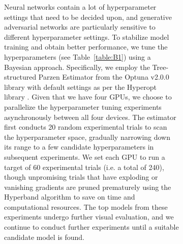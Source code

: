 \documentclass[tc, noline]{copernicus}
\begin{document}
\begin{figure}[t]
\begin{figure}[t]
Neural networks contain a lot of hyperparameter settings that need to be decided upon, and generative adversarial networks are particularly sensitive to different hyperparameter settings.
To stabilize model training and obtain better performance, we tune the hyperparameters (see Table~\ref{table:B1}) using a Bayesian approach.
Specifically, we employ the Tree-structured Parzen Estimator \citep{BergstraAlgorithmsHyperparameterOptimization2011} from the Optuna v2.0.0 \citep{AkibaOptunaNextgenerationHyperparameter2019} library with default settings as per the Hyperopt library \citep{BergstraHyperoptPythonlibrary2015}.
Given that we have four GPUs, we choose to parallelize the hyperparameter tuning experiments asynchronously between all four devices.
The estimator first conducts 20 random experimental trials to scan the hyperparameter space, gradually narrowing down its range to a few candidate hyperparameters in subsequent experiments.
We set each GPU to run a target of 60 experimental trials (i.e. a total of 240), though unpromising trials that have exploding or vanishing gradients are pruned prematurely using the Hyperband algorithm \citep{LiHyperbandNovelBanditBased2018} to save on time and computational resources.
The top models from these experiments undergo further visual evaluation, and we continue to conduct further experiments until a suitable candidate model is found.

\noappendix       %




\appendixfigures  %

\appendixtables   %


\end{figure}
\end{figure}
\end{document}
